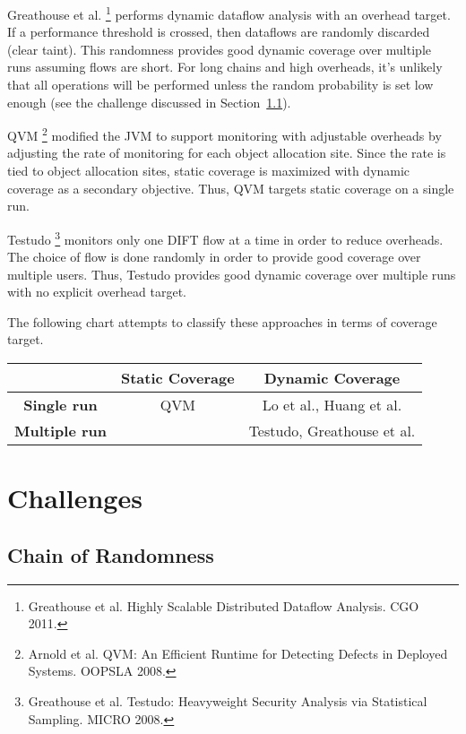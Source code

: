 \documentclass[11pt, letterpaper]{article}
\begin{document}
Greathouse et al. \footnote{Greathouse et al. Highly Scalable Distributed
Dataflow Analysis. CGO 2011.} performs dynamic dataflow analysis with an
overhead target. If a performance threshold is crossed, then dataflows are
randomly discarded (clear taint). This randomness provides good dynamic
coverage over multiple runs assuming flows are short. For long chains and high
overheads, it's unlikely that all operations will be performed unless the
random probability is set low enough (see the challenge discussed in
Section~\ref{sec:chain_of_randomness}).

QVM \footnote{Arnold et al. QVM: An Efficient Runtime for Detecting Defects in
Deployed Systems. OOPSLA 2008.} modified the JVM to support monitoring with adjustable
overheads by adjusting the rate of monitoring for each object allocation site.
Since the rate is tied to object allocation sites, static coverage is maximized
with dynamic coverage as a secondary objective. Thus, QVM targets static
coverage on a single run.

Testudo \footnote{Greathouse et al. Testudo: Heavyweight Security Analysis via
Statistical Sampling. MICRO 2008.} monitors only one DIFT flow at a time in order to reduce
overheads. The choice of flow is done randomly in order to provide good
coverage over multiple users. Thus, Testudo provides good dynamic coverage over
multiple runs with no explicit overhead target.

The following chart attempts to classify these approaches in terms of coverage
target.
\begin{center}
\begin{tabular}{c|c|c|}
 & \textbf{Static Coverage} & \textbf{Dynamic Coverage} \\ \hline
\textbf{Single run} & QVM & Lo et al., Huang et al. \\ \hline
\textbf{Multiple run} & & Testudo, Greathouse et al. \\ \hline
\end{tabular}
\end{center}

\section{Challenges}
\label{sec:challenges}

\subsection{Chain of Randomness}
\label{sec:chain_of_randomness}
\end{document}
